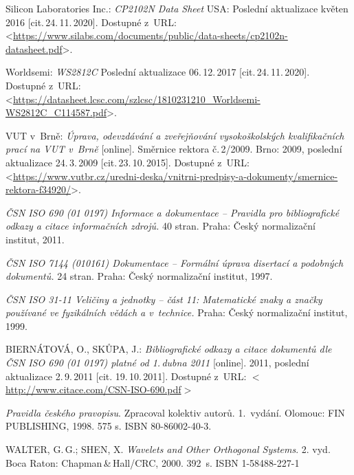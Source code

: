 \begin{thebibliography}{99}
    Silicon Laboratories Inc.:
    \emph{CP2102N Data Sheet}
    USA: Poslední aktualizace květen 2016 [cit.\,24.\,11.\,2020].
    Dostupné z~URL:\\
    <\url{https://www.silabs.com/documents/public/data-sheets/cp2102n-datasheet.pdf}>.

    Worldsemi:
    \emph{WS2812C}
    Poslední aktualizace 06.\,12.\,2017 [cit.\,24.\,11.\,2020].
    Dostupné z~URL:\\
    <\url{https://datasheet.lcsc.com/szlcsc/1810231210_Worldsemi-WS2812C_C114587.pdf}>.

		VUT v~Brně:
    \emph{Úprava, odevzdávání a zveřejňování vysokoškolských kva\-li\-fi\-kač\-ních prací na VUT v~Brně}\/ [online].
		Směrnice rektora č.\,2/2009.
		Brno: 2009, po\-sled\-ní aktualizace 24.\,3.\,2009 [cit.\,23.\,10.\,2015].
    Dostupné z~URL:\\
    <\url{https://www.vutbr.cz/uredni-deska/vnitrni-predpisy-a-dokumenty/smernice-rektora-f34920/}>.

    \emph{ČSN ISO 690 (01 0197) Informace a dokumentace -- Pravidla pro bibliografické odkazy a citace informačních zdrojů.}
    40 stran. Praha: Český normalizační institut, 2011.

    \emph{ČSN ISO 7144 (010161) Dokumentace -- Formální úprava disertací a podobných dokumentů.}
    24 stran. Praha: Český normalizační institut, 1997.

    \emph{ČSN ISO 31-11 Veličiny a jednotky -- část 11: Matematické znaky a značky používané ve fyzikálních vědách a v~technice.}
    Praha: Český normalizační institut, 1999.

    BIERNÁTOVÁ, O., SKŮPA, J.:
    \emph{Bibliografické odkazy a citace dokumentů dle ČSN ISO 690 (01 0197) platné od 1.\,dubna 2011}\/ [online].
    2011, poslední aktualizace 2.\,9.\,2011 [cit. 19.\,10.\,2011].
    Dostupné z~URL:
    \(<\)\url{http://www.citace.com/CSN-ISO-690.pdf}\(>\)

    \emph{Pravidla českého pravopisu}.
    Zpracoval kolektiv autorů. 1.\ vydání.
    Olomouc: FIN PUB\-LISH\-ING, 1998. 575 s. ISBN 80-86002-40-3.

	WALTER, G.\,G.; SHEN, X.
	\emph{Wavelets and Other Orthogonal Systems}.
	2. vyd. Boca Raton: Chapman\,\&\,Hall/CRC, 2000. 392~s. ISBN 1-58488-227-1


\end{thebibliography}
